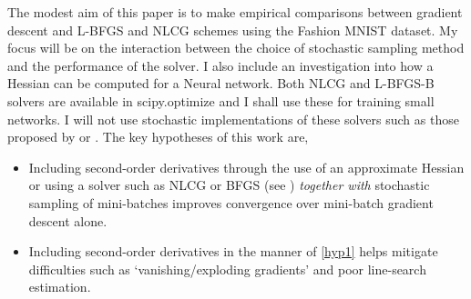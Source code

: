 \documentclass[11pt,twocolumn]{article}
\begin{document}
The modest aim of this paper is to make empirical comparisons between gradient descent and L-BFGS and NLCG schemes using the Fashion MNIST dataset. My focus will be on the interaction between the choice of stochastic sampling method and the performance of the solver. I also include an investigation into how a Hessian can be computed for a  Neural network. Both NLCG and L-BFGS-B solvers are available in scipy.optimize \cite{scipy:min} and I shall use these for training small networks. I will not use stochastic implementations of these solvers such as those proposed by \cite{Zhao:SLBFGS} or \cite{Hong:SCGM}. The key hypotheses of this work are, 
\begin{itemize}
\item
Including second-order derivatives through the use of an approximate Hessian or using a solver such as NLCG or BFGS (see \cite{Nocedal:Wright}) \textit{together with} stochastic sampling of mini-batches improves convergence over mini-batch gradient descent alone.\label{hyp1}
\item
Including second-order derivatives in the manner of \ref{hyp1} helps mitigate difficulties such as `vanishing/exploding gradients' and poor line-search estimation.
\end{itemize}
\end{document}
